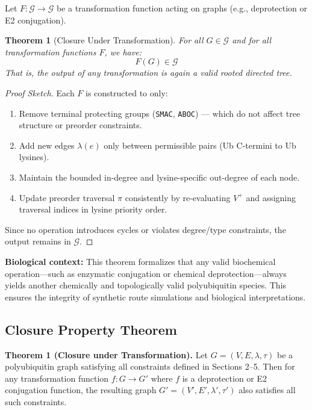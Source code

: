 \documentclass[12pt]{article}
\newtheorem{theorem}{Theorem}
\begin{document}
 Let $F : \mathcal{G} \to \mathcal{G}$ be a transformation function acting on graphs (e.g., deprotection or E2 conjugation).

 \begin{theorem}[Closure Under Transformation]
 For all $G \in \mathcal{G}$ and for all transformation functions $F$, we have:
 \[
 F(G) \in \mathcal{G}
 \]
 That is, the output of any transformation is again a valid rooted directed tree.
 \end{theorem}

 \vspace{1em}
 \begin{proof}[Proof Sketch]
 Each $F$ is constructed to only:
 \begin{enumerate}
     \item Remove terminal protecting groups (\texttt{SMAC}, \texttt{ABOC}) — which do not affect tree structure or preorder constraints.
     \item Add new edges $\lambda(e)$ only between permissible pairs (Ub C-termini to Ub lysines).
     \item Maintain the bounded in-degree and lysine-specific out-degree of each node.
     \item Update preorder traversal $\pi$ consistently by re-evaluating $V^+$ and assigning traversal indices in lysine priority order.
 \end{enumerate}
 Since no operation introduces cycles or violates degree/type constraints, the output remains in $\mathcal{G}$.
 \end{proof}

 \vspace{1em}
 \textbf{Biological context:} This theorem formalizes that any valid biochemical operation—such as enzymatic conjugation or chemical deprotection—always yields another chemically and topologically valid polyubiquitin species. This ensures the integrity of synthetic route simulations and biological interpretations.

\subsection*{Closure Property Theorem}

\vspace{1em}
\textbf{Theorem 1 (Closure under Transformation).} Let $G = (V, E, \lambda, \tau)$ be a polyubiquitin graph satisfying all constraints defined in Sections 2–5. Then for any transformation function $f : G \to G'$ where $f$ is a deprotection or E2 conjugation function, the resulting graph $G' = (V', E', \lambda', \tau')$ also satisfies all such constraints.
\end{document}
